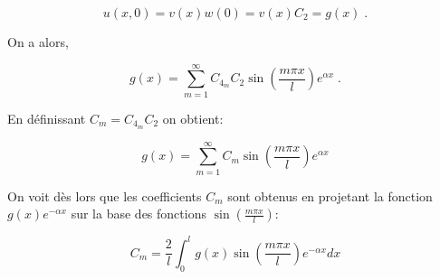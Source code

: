 \documentclass[a4paper, 12pt]{report}
\begin{document}
\begin{equation}
  u(x,0) = v(x) w(0) = v(x) C_{2} = g(x)\;.
\end{equation}

On a alors,

\begin{equation}
  g(x) = \sum_{m=1}^{\infty} C_{4_m}C_{2} \sin \left (\frac{m \pi x}{l} \right ) e^{\alpha x}\;.
\end{equation}

En définissant $C_m = C_{4_m}C_{2}$ on obtient:

\begin{equation}
  g(x) = \sum_{m=1}^{\infty} C_m \sin \left (\frac{m \pi x}{l} \right ) e^{\alpha x}
\end{equation}

On voit dès lors que les coefficients $C_m$ sont obtenus
en projetant la fonction $g(x)e^{-\alpha x}$ sur la base des fonctions $\sin \left (\frac{m \pi x}{l} \right )$:

\begin{equation}
  C_m = \frac{2}{l} \int_0^l g(x) \sin \left (\frac{m \pi x}{l} \right ) e^{-\alpha x} dx
\end{equation}








\end{document}
